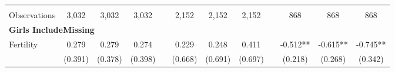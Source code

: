 \begin{landscape}
\begin{table}[htpb!]
\begin{center}
\begin{tabular}{lcccp{2mm}cccp{2mm}ccc}
\begin{footnotesize}\end{footnotesize}&\begin{footnotesize}\end{footnotesize}&\begin{footnotesize}\end{footnotesize}&\begin{footnotesize}\end{footnotesize}&\begin{footnotesize}\end{footnotesize}&\begin{footnotesize}\end{footnotesize}&\begin{footnotesize}\end{footnotesize}&\begin{footnotesize}\end{footnotesize}&\begin{footnotesize}\end{footnotesize}&\begin{footnotesize}\end{footnotesize}&\begin{footnotesize}\end{footnotesize}&\begin{footnotesize}\end{footnotesize}\\Observations&3,032&3,032&3,032&&2,152&2,152&2,152&&868&868&868\\
\multicolumn{12}{l}{\textbf{Girls IncludeMissing}}\\ 
Fertility&0.279&0.279&0.274&&0.229&0.248&0.411&&-0.512**&-0.615**&-0.745**\\
&(0.391)&(0.378)&(0.398)&&(0.668)&(0.691)&(0.697)&&(0.218)&(0.268)&(0.342)\\

\end{tabular}
\end{center}
\end{table}
\end{landscape}
